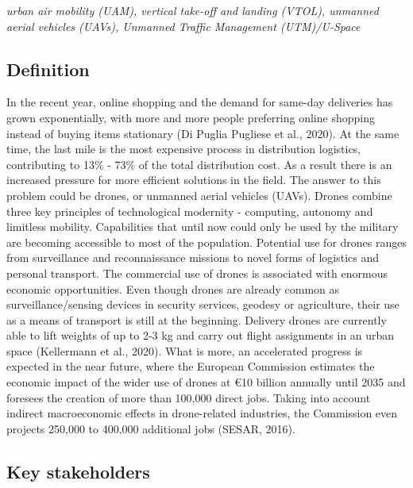 \documentclass[
]{book}
\begin{document}
\emph{urban air mobility (UAM), vertical take-off and landing (VTOL), unmanned aerial vehicles (UAVs), Unmanned Traffic Management (UTM)/U-Space}

\hypertarget{definition-8}{%
\subsection*{Definition}\label{definition-8}}

In the recent year, online shopping and the demand for same-day deliveries has grown exponentially, with more and more people preferring online shopping instead of buying items stationary (Di Puglia Pugliese et al., 2020). At the same time, the last mile is the most expensive process in distribution logistics, contributing to 13\% - 73\% of the total distribution cost. As a result there is an increased pressure for more efficient solutions in the field. The answer to this problem could be drones, or unmanned aerial vehicles (UAVs). Drones combine three key principles of technological modernity - computing, autonomy and limitless mobility. Capabilities that until now could only be used by the military are becoming accessible to most of the population. Potential use for drones ranges from surveillance and reconnaissance missions to novel forms of logistics and personal transport. The commercial use of drones is associated with enormous economic opportunities. Even though drones are already common as surveillance/sensing devices in security services, geodesy or agriculture, their use as a means of transport is still at the beginning. Delivery drones are currently able to lift weights of up to 2-3 kg and carry out flight assignments in an urban space (Kellermann et al., 2020).
What is more, an accelerated progress is expected in the near future, where the European Commission estimates the economic impact of the wider use of drones at €10 billion annually until 2035 and foresees the creation of more than 100,000 direct jobs. Taking into account indirect macroeconomic effects in drone-related industries, the Commission even projects 250,000 to 400,000 additional jobs (SESAR, 2016).

\hypertarget{key-stakeholders-8}{%
\subsection*{Key stakeholders}\label{key-stakeholders-8}}
\end{document}
